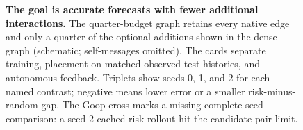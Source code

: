 \begin{figure}[t]
\caption{\textbf{The goal is accurate forecasts with fewer additional interactions.} The quarter-budget graph retains every native edge and only a quarter of the optional additions shown in the dense graph (schematic; self-messages omitted). The cards separate training, placement on matched observed test histories, and autonomous feedback. Triplets show seeds 0, 1, and 2 for each named contrast; negative means lower error or a smaller risk-minus-random gap. The Goop cross marks a missing complete-seed comparison: a seed-2 cached-risk rollout hit the candidate-pair limit.}
\label{fig:constructive-overview}
\end{figure}
